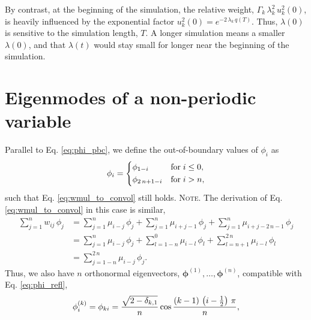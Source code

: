 \documentclass[preprint, floatfix]{revtex4-1}
\newcommand{\note}[1]{{\color{DarkGreen}\footnotesize \textsc{Note.} #1}}
\begin{document}
By contrast,
at the beginning of the simulation,
the relative weight, $\Gamma_k \, \lambda_k^2 \, u_k^2(0)$,
is heavily influenced by the exponential factor
$u_k^2(0) = e^{ -2 \, \lambda_k \, q(T) }$.
%
Thus, $\lambda(0)$
is sensitive to the simulation length, $T$.
%
A longer simulation means a smaller $\lambda(0)$,
and that $\lambda(t)$ would stay small
for longer near the beginning of the simulation.






\section{
Eigenmodes of a non-periodic variable}




Parallel to Eq. \eqref{eq:phi_pbc},
we define the out-of-boundary values
of $\phi_i$ as
%
\begin{equation}
  \phi_i
  =
  \begin{dcases}
    \phi_{ 1 - i }           & \mathrm{for \;} i \le 0, \\
    \phi_{ 2 \, n + 1 - i }  & \mathrm{for \;} i > n,
  \end{dcases}
\label{eq:phi_refl}
\end{equation}
%
such that Eq. \eqref{eq:wmul_to_convol}
still holds.
%
\note{The derivation of Eq. \eqref{eq:wmul_to_convol}
  in this case is similar,
  $$
  \begin{aligned}
    \sum_{j = 1}^n w_{ij} \, \phi_j
    &=
    \sum_{j = 1}^n
      \mu_{i - j} \, \phi_j
    +
    \sum_{j = 1}^n
      \mu_{i + j - 1} \, \phi_j
    +
    \sum_{j = 1}^n
      \mu_{i + j - 2 \, n - 1} \, \phi_j
    \\
    &=
    \sum_{j = 1}^n
      \mu_{i - j} \, \phi_j
    +
    \sum_{l = 1 - n}^0
      \mu_{i - l} \, \phi_l
    +
    \sum_{l = n + 1}^{ 2 \, n }
      \mu_{i - l} \, \phi_l
    \\
    &=
    \sum_{j = 1 - n}^{ 2 \, n}
      \mu_{i - j} \, \phi_j.
  \end{aligned}
  $$
}%
Thus, we also have $n$ orthonormal eigenvectors,
$\pmb\phi^{(1)}, \dots, \pmb\phi^{(n)}$,
compatible with Eq. \eqref{eq:phi_refl},
%
\begin{equation}
  \phi^{(k)}_i
  =
  \phi_{k i}
  =
  \frac{ \sqrt{ 2 - \delta_{k, 1} } }
       {             n              }
  \cos \frac{ ( k - 1) \, \left( i - \frac 1 2 \right) \, \pi}
            {                    n                           }
  ,
\notag
\end{equation}
\end{document}
